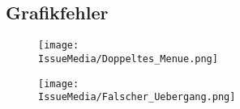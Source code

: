 %



\clearpage


	
	
\subsection*{Grafikfehler}



%
%	
%	
%


\begin{figure}[ht]

	\centering
	
	\texttt{[image: \\IssueMedia/Doppeltes\_Menue.png]}
	
	\caption{}

\end{figure}


\begin{figure}[ht]

	\centering
	
	\texttt{[image: \\IssueMedia/Falscher\_Uebergang.png]}
	
	\caption{}

\end{figure}

